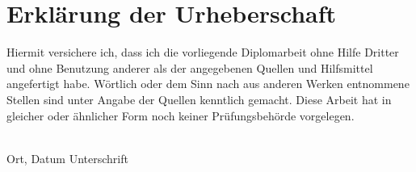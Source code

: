 \chapter*{Erklärung der Urheberschaft}
\vfill
Hiermit versichere ich, dass ich die vorliegende Diplomarbeit ohne Hilfe
Dritter und ohne Benutzung anderer als der angegebenen Quellen und Hilfsmittel
angefertigt habe. Wörtlich oder dem Sinn nach aus anderen Werken entnommene
Stellen sind unter Angabe der Quellen kenntlich gemacht. Diese Arbeit hat in
gleicher oder ähnlicher Form noch keiner Prüfungsbehörde vorgelegen.

\par\vfill\vfill\noindent
\hrulefill\hfill\hrulefill\\
Ort, Datum  \hfill Unterschrift\\


\newpage
\thispagestyle{empty}

